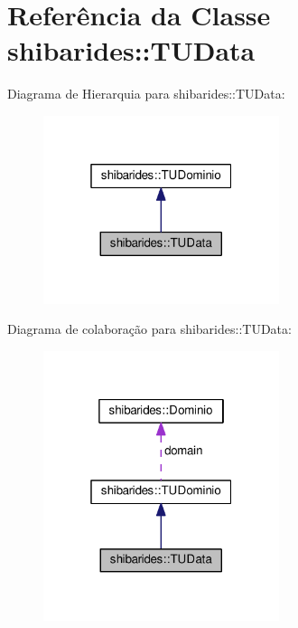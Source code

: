 \hypertarget{classshibarides_1_1TUData}{}\section{Referência da Classe shibarides\+:\+:T\+U\+Data}
\label{classshibarides_1_1TUData}


Diagrama de Hierarquia para shibarides\+:\+:T\+U\+Data\+:\nopagebreak
\begin{figure}[H]
\begin{center}
\leavevmode
\includegraphics[width=196pt]{classshibarides_1_1TUData__inherit__graph}
\end{center}
\end{figure}


Diagrama de colaboração para shibarides\+:\+:T\+U\+Data\+:\nopagebreak
\begin{figure}[H]
\begin{center}
\leavevmode
\includegraphics[width=196pt]{classshibarides_1_1TUData__coll__graph}
\end{center}
\end{figure}
